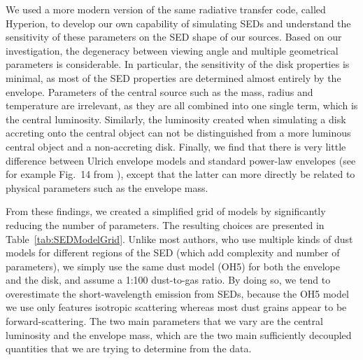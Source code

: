 We used a more modern version of the same radiative transfer code, called Hyperion, to develop our own capability of simulating SEDs and understand the sensitivity of these parameters on the SED shape of our sources. Based on our investigation, the degeneracy between viewing angle and multiple geometrical parameters is considerable. In particular, the sensitivity of the disk properties is minimal, as most of the SED properties are determined almost entirely by the envelope. Parameters of the central source such as the mass, radius and temperature are irrelevant, as they are all combined into one single term, which is the central luminosity. Similarly, the luminosity created when simulating a disk accreting onto the central object can not be distinguished from a more luminous central object and a non-accreting disk. Finally, we find that there is very little difference between Ulrich envelope models and standard power-law envelopes (see for example Fig.~14 from \citet{Whitney:2013cw}), except that the latter can more directly be related to physical parameters such as the envelope mass. 

From these findings, we created a simplified grid of models by significantly reducing the number of parameters. The resulting choices are presented in Table~\ref{tab:SEDModelGrid}. Unlike most authors, who use multiple kinds of dust models for different regions of the SED (which add complexity and number of parameters), we simply use the same dust model (OH5) for both the envelope and the disk, and assume a 1:100 dust-to-gas ratio. By doing so, we tend to overestimate the short-wavelength emission from SEDs, because the OH5 model we use only features isotropic scattering whereas most dust grains appear to be forward-scattering. The two main parameters that we vary are the central luminosity and the envelope mass, which are the two main sufficiently decoupled quantities that we are trying to determine from the data. 


